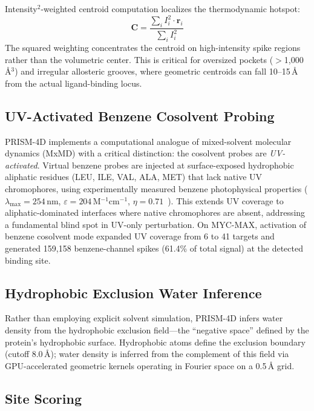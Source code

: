 \documentclass{sn-jnl}
\begin{document}
Intensity$^2$-weighted centroid computation localizes the thermodynamic hotspot:
\begin{equation}
  \mathbf{C} = \frac{\sum_i I_i^2 \cdot \mathbf{r}_i}{\sum_i I_i^2}
  \label{eq:centroid}
\end{equation}
The squared weighting concentrates the centroid on high-intensity spike regions rather than
the volumetric center. This is critical for oversized pockets ($>$1{,}000\,\AA$^3$) and
irregular allosteric grooves, where geometric centroids can fall 10--15\,\AA{} from the
actual ligand-binding locus.

\subsection{UV-Activated Benzene Cosolvent Probing}
\label{sec:benzene}

PRISM-4D implements a computational analogue of mixed-solvent molecular dynamics (MxMD) with
a critical distinction: the cosolvent probes are \textit{UV-activated}. Virtual benzene probes
are injected at surface-exposed hydrophobic aliphatic residues (LEU, ILE, VAL, ALA, MET) that
lack native UV chromophores, using experimentally measured benzene photophysical properties
($\lambda_{\max} = 254$\,nm, $\varepsilon = 204$\,M$^{-1}$cm$^{-1}$,
$\eta = 0.71$~\cite{pantos1978,cundall1972}). This extends UV coverage to aliphatic-dominated
interfaces where native chromophores are absent, addressing a fundamental blind spot in
UV-only perturbation. On MYC-MAX, activation of benzene cosolvent mode expanded UV coverage
from 6 to 41 targets and generated 159{,}158 benzene-channel spikes (61.4\% of total signal)
at the detected binding site.

\subsection{Hydrophobic Exclusion Water Inference}
\label{sec:water}

Rather than employing explicit solvent simulation, PRISM-4D infers water density from the
hydrophobic exclusion field---the ``negative space'' defined by the protein's hydrophobic
surface. Hydrophobic atoms define the exclusion boundary (cutoff 8.0\,\AA{}); water density
is inferred from the complement of this field via GPU-accelerated geometric kernels operating
in Fourier space on a 0.5\,\AA{} grid.

\subsection{Site Scoring}
\label{sec:scoring}
\end{document}
